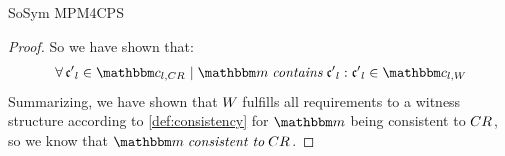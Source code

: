 \begin{copiedFrom}{SoSym MPM4CPS}
\begin{proof}
    So we have shown that:
    \begin{align*}
        \formulaskip &
        \forall \conditionelement{c'}{l} \in \condition{c}{l,\consistencyrelation{CR}{}} \mid \modelset{m} \containsmath \conditionelement{c'}{l} : \conditionelement{c'}{l} \in \condition{c}{l,\consistencyrelation{W}{}}
    \end{align*}
    Summarizing, we have shown that $W_{}$ fulfills all requirements to a witness structure according to \autoref{def:consistency} for $\modelset{m}$ being consistent to $CR_{}$, so we know that $\modelset{m} \consistenttomath \consistencyrelation{CR}{}$.
        

\end{proof}
\end{copiedFrom}
